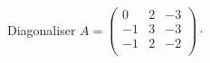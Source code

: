 \documentclass[a4paper,10pt]{report}
\begin{document}
\begin{ex} Diagonaliser $A = \begin{pmatrix}
0& 2 & -3 \\
-1 & 3 & -3 \\
-1 & 2 & -2 \\
\end{pmatrix} \cdot$
%

\end{ex}
\end{document}
